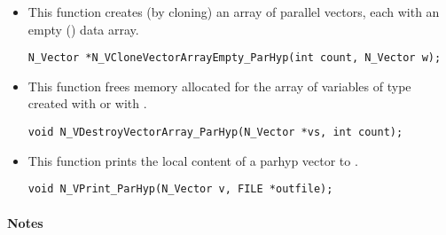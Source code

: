 \begin{itemize}
\item {}
 
  This function creates (by cloning) an array of  parallel vectors,
  each with an empty () data array.
 
\begin{verbatim}
N_Vector *N_VCloneVectorArrayEmpty_ParHyp(int count, N_Vector w);
\end{verbatim}


\item {}
 
 This function frees memory allocated for the array of   variables of
 type  created with  or with
 .
 

 \verb|void N_VDestroyVectorArray_ParHyp(N_Vector *vs, int count);|



\item {}
  
  This function prints the local content of a parhyp vector to .
 
    
  \verb|void N_VPrint_ParHyp(N_Vector v, FILE *outfile);|


\end{itemize}

\paragraph{\bf Notes} 
           
